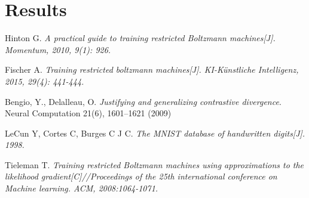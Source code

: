 \documentclass[a4paper,10pt]{article}
\newcommand{\todo}[1]{\textcolor{red}{TODO: #1}\PackageWarning{TODO:}{#1!}}
\begin{document}
\section{Results}



\begin{thebibliography}{9}
	\setlength{\parskip}{0pt} 
	
	 Hinton G. 
	\textit{ A practical guide to training restricted Boltzmann machines[J]. Momentum, 2010, 9(1): 926.}
	
	 Fischer A. 
	\textit{Training restricted boltzmann machines[J]. KI-Künstliche Intelligenz, 2015, 29(4): 441-444.}

	  Bengio, Y., Delalleau, O. \textit{Justifying and generalizing contrastive divergence}. Neural Computation 21(6), 1601–1621 (2009)
	
	 LeCun Y, Cortes C, Burges C J C. 
	\textit{The MNIST database of handwritten digits[J]. 1998.}
	
	Tieleman T.
	\textit{Training restricted Boltzmann machines using approximations to the likelihood gradient[C]//Proceedings of the 25th international conference on Machine learning. ACM, 2008:1064-1071.} 
	
\end{thebibliography}
\end{document}
